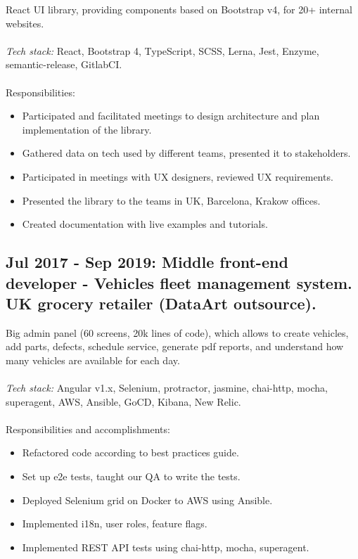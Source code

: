 \documentclass[a4paper, 14pt]{article}
\begin{document}
  React UI library, providing components based on Bootstrap v4, for 20+ internal websites. \\
  \\
    \textit{Tech stack:} React, Bootstrap 4, TypeScript, SCSS, Lerna, Jest, Enzyme, semantic-release, GitlabCI. \\
  \\
  Responsibilities:
    \begin{itemize}
      \item Participated and facilitated meetings to design architecture and plan implementation of the library. \\
      \item Gathered data on tech used by different teams, presented it to stakeholders. \\
      \item Participated in meetings with UX designers, reviewed UX requirements. \\
      \item Presented the library to the teams in UK, Barcelona, Krakow offices. \\
      \item Created documentation with live examples and tutorials. \\
    \end{itemize}

  \subsection{Jul 2017 - Sep 2019: Middle front-end developer - Vehicles fleet management system. UK grocery retailer (DataArt outsource).
}
  Big admin panel (60 screens, 20k lines of code), which allows to create vehicles, add parts, defects, schedule service, generate pdf reports, and understand how many vehicles are available for each day. \\
  \\
  \textit{Tech stack:} Angular v1.x, Selenium, protractor, jasmine, chai-http, mocha, superagent, AWS, Ansible, GoCD, Kibana, New Relic.
  \\
  \\
  Responsibilities and accomplishments:
    \begin{itemize}
      \item Refactored code according to best practices guide. \\
      \item Set up e2e tests, taught our QA to write the tests. \\
      \item Deployed Selenium grid on Docker to AWS using Ansible. \\
      \item Implemented i18n, user roles, feature flags. \\
      \item Implemented REST API tests using chai-http, mocha, superagent. \\
    \end{itemize}
\end{document}
